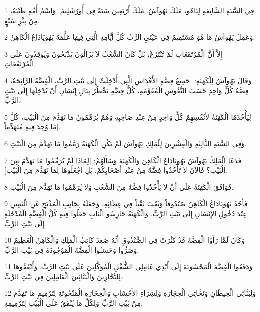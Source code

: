 \par 1 فِي السَّنَةِ السَّابِعَةِ لِيَاهُو، مَلَكَ يَهُوآشُ. مَلَكَ أَرْبَعِينَ سَنَةً فِي أُورُشَلِيمَ. وَاسْمُ أُمِّهِ ظَبْيَةُ، مِنْ بِئْرِ سَبْعٍ.
\par 2 وَعَمِلَ يَهُوآشُ مَا هُوَ مُسْتَقِيمٌ فِي عَيْنَيِ الرَّبِّ كُلَّ أَيَّامِهِ الَّتِي فِيهَا عَلَّمَهُ يَهُويَادَاعُ الْكَاهِنُ.
\par 3 إِلاَّ أَنَّ الْمُرْتَفَعَاتِ لَمْ تُنْتَزَعْ، بَلْ كَانَ الشَّعْبُ لاَ يَزَالُونَ يَذْبَحُونَ وَيُوقِدُونَ عَلَى الْمُرْتَفَعَاتِ.
\par 4 وَقَالَ يَهُوآشُ لِلْكَهَنَةِ: [جَمِيعُ فِضَّةِ الأَقْدَاسِ الَّتِي أُدْخِلَتْ إِلَى بَيْتِ الرَّبِّ، الْفِضَّةُ الرَّائِجَةُ، فِضَّةُ كُلِّ وَاحِدٍ حَسَبَ النُّفُوسِ الْمُقَوَّمَةِ، كُلُّ فِضَّةٍ يَخْطُرُ بِبَالِ إِنْسَانٍ أَنْ يُدْخِلَهَا إِلَى بَيْتِ الرَّبِّ،
\par 5 لِيَأْخُذَهَا الْكَهَنَةُ لأَنْفُسِهِمْ كُلُّ وَاحِدٍ مِنْ عِنْدِ صَاحِبِهِ وَهُمْ يُرَمِّمُونَ مَا تَهَدَّمَ مِنَ الْبَيْتِ، كُلَّ مَا وُجِدَ فِيهِ مُتَهَدِّماً].
\par 6 وَفِي السَّنَةِ الثَّالِثَةِ وَالْعِشْرِينَ لِلْمَلِكِ يَهُوآشَ لَمْ تَكُنِ الْكَهَنَةُ رَمَّمُوا مَا تَهَدَّمَ مِنَ الْبَيْتِ.
\par 7 فَدَعَا الْمَلِكُ يَهُوآشُ يَهُويَادَاعَ الْكَاهِنَ وَالْكَهَنَةَ وَسَأَلَهُمْ: [لِمَاذَا لَمْ تُرَمِّمُوا مَا تَهَدَّمَ مِنَ الْبَيْتِ؟ فَالآنَ لاَ تَأْخُذُوا فِضَّةً مِنْ عِنْدِ أَصْحَابِكُمْ، بَلِ اجْعَلُوهَا لِمَا تَهَدَّمَ مِنَ الْبَيْتِ].
\par 8 فَوَافَقَ الْكَهَنَةُ عَلَى أَنْ لاَ يَأْخُذُوا فِضَّةً مِنَ الشَّعْبِ وَلاَ يُرَمِّمُوا مَا تَهَدَّمَ مِنَ الْبَيْتِ.
\par 9 فَأَخَذَ يَهُويَادَاعُ الْكَاهِنُ صُنْدُوقاً وَثَقَبَ ثَقْباً فِي غِطَائِهِ، وَجَعَلَهُ بِجَانِبِ الْمَذْبَحِ عَنِ الْيَمِينِ عِنْدَ دُخُولِ الإِنْسَانِ إِلَى بَيْتِ الرَّبِّ. وَالْكَهَنَةُ حَارِسُو الْبَابِ جَعَلُوا فِيهِ كُلَّ الْفِضَّةِ الْمُدْخَلَةِ إِلَى بَيْتِ الرَّبِّ.
\par 10 وَكَانَ لَمَّا رَأَوُا الْفِضَّةَ قَدْ كَثُرَتْ فِي الصُّنْدُوقِ أَنَّهُ صَعِدَ كَاتِبُ الْمَلِكِ وَالْكَاهِنُ الْعَظِيمُ وَصَرُّوا وَحَسَبُوا الْفِضَّةَ الْمَوْجُودَةَ فِي بَيْتِ الرَّبِّ.
\par 11 وَدَفَعُوا الْفِضَّةَ الْمَحْسُوبَةَ إِلَى أَيْدِي عَامِلِي الشُّغْلِ الْمُوَكَّلِينَ عَلَى بَيْتِ الرَّبِّ، وَأَنْفَقُوهَا لِلنَّجَّارِينَ وَالْبَنَّائِينَ الْعَامِلِينَ فِي بَيْتِ الرَّبِّ،
\par 12 وَلِبَنَّائِي الْحِيطَانِ وَنَحَّاتِي الْحِجَارَةِ وَلِشِرَاءِ الأَخْشَابِ وَالْحِجَارَةِ الْمَنْحُوتَةِ لِتَرْمِيمِ مَا تَهَدَّمَ مِنْ بَيْتِ الرَّبِّ وَلِكُلِّ مَا يُنْفَقُ عَلَى الْبَيْتِ لِتَرْمِيمِهِ.
